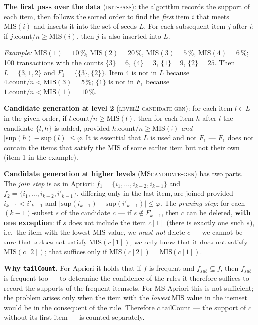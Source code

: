 \documentclass[11pt,a4paper]{article}
\theoremstyle{definition}
\begin{document}
\textbf{The first pass over the data} (\textsc{init-pass}): the algorithm records the support of
each item, then follows the sorted order to find the \emph{first} item $i$ that meets
$\mathrm{MIS}(i)$ and inserts it into the set of seeds $L$. For each subsequent item $j$ after
$i$: if $j.\mathrm{count}/n\ge \mathrm{MIS}(i)$, then $j$ is also inserted into $L$.

\emph{Example:} $\mathrm{MIS}(1)=10\,\%$, $\mathrm{MIS}(2)=20\,\%$, $\mathrm{MIS}(3)=5\,\%$,
$\mathrm{MIS}(4)=6\,\%$; 100 transactions with the counts $\{3\}=6$, $\{4\}=3$, $\{1\}=9$,
$\{2\}=25$. Then $L=\{3,1,2\}$ and $F_1=\{\{3\},\{2\}\}$. Item 4 is not in $L$ because
$4.\mathrm{count}/n<\mathrm{MIS}(3)=5\,\%$; $\{1\}$ is not in $F_1$ because
$1.\mathrm{count}/n<\mathrm{MIS}(1)=10\,\%$.

\textbf{Candidate generation at level 2} (\textsc{level2-candidate-gen}): for each item $l\in L$
in the given order, if $l.\mathrm{count}/n\ge\mathrm{MIS}(l)$, then for each item $h$ after $l$
the candidate $\{l,h\}$ is added, provided $h.\mathrm{count}/n\ge\mathrm{MIS}(l)$ \emph{and}
$|\mathrm{sup}(h)-\mathrm{sup}(l)|\le\varphi$. It is essential that $L$ is used and not $F_1$
--- $F_1$ does not contain the items that satisfy the MIS of some earlier item but not their own
(item 1 in the example).

\textbf{Candidate generation at higher levels} (\textsc{MScandidate-gen}) has two parts. The
\emph{join step} is as in Apriori: $f_1=\{i_1,\dots,i_{k-2},i_{k-1}\}$ and
$f_2=\{i_1,\dots,i_{k-2},i'_{k-1}\}$, differing only in the last item, are joined provided
$i_{k-1}<i'_{k-1}$ and $|\mathrm{sup}(i_{k-1})-\mathrm{sup}(i'_{k-1})|\le\varphi$. The
\emph{pruning step}: for each $(k-1)$-subset $s$ of the candidate $c$ --- if $s\notin F_{k-1}$,
then $c$ can be deleted, \textbf{with one exception}: if $s$ does not include the item $c[1]$
(there is exactly one such $s$), i.e.\ the item with the lowest MIS value, we \emph{must not}
delete $c$ --- we cannot be sure that $s$ does not satisfy $\mathrm{MIS}(c[1])$, we only know
that it does not satisfy $\mathrm{MIS}(c[2])$; that suffices only if
$\mathrm{MIS}(c[2])=\mathrm{MIS}(c[1])$.

\textbf{Why \texttt{tailCount}.} For Apriori it holds that if $f$ is frequent and
$f_{sub}\subseteq f$, then $f_{sub}$ is frequent too --- to determine the confidence of the rules
it therefore suffices to record the supports of the frequent itemsets. For MS-Apriori this is not
sufficient; the problem arises only when the item with the \emph{lowest} MIS value in the itemset
would be in the consequent of the rule. Therefore $c.\mathrm{tailCount}$ --- the support of $c$
without its first item --- is counted separately.
\end{document}
